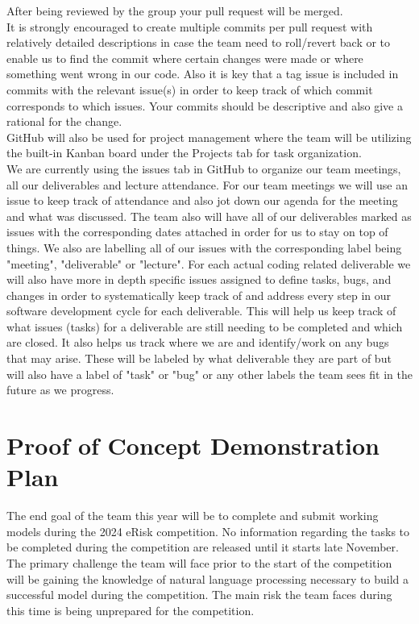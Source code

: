 \documentclass{article}
\begin{document}
After being reviewed by the group your pull request will be merged.\\

It is strongly encouraged to create multiple commits per pull request with relatively detailed descriptions in case the team need to roll/revert back or to enable us to find the commit where certain changes were made or where something went wrong in our code. Also it is key that a tag issue is included in commits with the relevant issue(s) in order to keep track of which commit corresponds to which issues. Your commits should be descriptive and also give a rational for the change.\\

GitHub will also be used for project management where the team will be utilizing the built-in Kanban board under the Projects tab for task organization. \\

We are currently using the issues tab in GitHub to organize our team meetings, all our deliverables and lecture attendance. For our team meetings we will use an issue to keep track of attendance and also jot down our agenda for the meeting and what was discussed. The team also will have all of our deliverables marked as issues with the corresponding dates attached in order for us to stay on top of things. We also are labelling all of our issues with the corresponding label being "meeting", "deliverable" or "lecture". For each actual coding related deliverable we will also have more in depth specific issues assigned to define tasks, bugs, and changes in order to systematically keep track of and address every step in our software development cycle for each deliverable. This will help us keep track of what issues (tasks) for a deliverable are still needing to be completed and which are closed. It also helps us track where we are and identify/work on any bugs that may arise. These will be labeled by what deliverable they are part of but will also have a label of "task" or "bug" or any other labels the team sees fit in the future as we progress.

\section{Proof of Concept Demonstration Plan}

The end goal of the team this year will be to complete and submit working models during the 2024 eRisk competition. No information regarding the tasks to be completed during the competition are released until it starts late November. The primary challenge the team will face prior to the start of the competition will be gaining the knowledge of natural language processing necessary to build a successful model during the competition. The main risk the team faces during this time is being unprepared for the competition.
\end{document}
